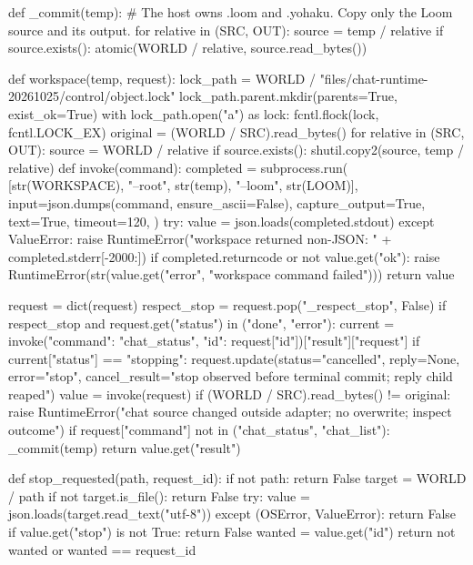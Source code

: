 def _commit(temp):
    # The host owns .loom and .yohaku. Copy only the Loom source and its output.
    for relative in (SRC, OUT):
        source = temp / relative
        if source.exists():
            atomic(WORLD / relative, source.read_bytes())


def workspace(temp, request):
    lock_path = WORLD / "files/chat-runtime-20261025/control/object.lock"
    lock_path.parent.mkdir(parents=True, exist_ok=True)
    with lock_path.open("a") as lock:
        fcntl.flock(lock, fcntl.LOCK_EX)
        original = (WORLD / SRC).read_bytes()
        for relative in (SRC, OUT):
            source = WORLD / relative
            if source.exists():
                shutil.copy2(source, temp / relative)
        def invoke(command):
            completed = subprocess.run(
                [str(WORKSPACE), "--root", str(temp), "--loom", str(LOOM)],
                input=json.dumps(command, ensure_ascii=False),
                capture_output=True, text=True, timeout=120,
            )
            try:
                value = json.loads(completed.stdout)
            except ValueError:
                raise RuntimeError("workspace returned non-JSON: " + completed.stderr[-2000:])
            if completed.returncode or not value.get("ok"):
                raise RuntimeError(str(value.get("error", "workspace command failed")))
            return value

        request = dict(request)
        respect_stop = request.pop("_respect_stop", False)
        if respect_stop and request.get("status") in ("done", "error"):
            current = invoke({"command": "chat_status", "id": request["id"]})["result"]["request"]
            if current["status"] == "stopping":
                request.update(status="cancelled", reply=None, error="stop",
                               cancel_result="stop observed before terminal commit; reply child reaped")
        value = invoke(request)
        if (WORLD / SRC).read_bytes() != original:
            raise RuntimeError("chat source changed outside adapter; no overwrite; inspect outcome")
        if request["command"] not in ("chat_status", "chat_list"):
            _commit(temp)
        return value.get("result")


def stop_requested(path, request_id):
    if not path:
        return False
    target = WORLD / path
    if not target.is_file():
        return False
    try:
        value = json.loads(target.read_text("utf-8"))
    except (OSError, ValueError):
        return False
    if value.get("stop") is not True:
        return False
    wanted = value.get("id")
    return not wanted or wanted == request_id


